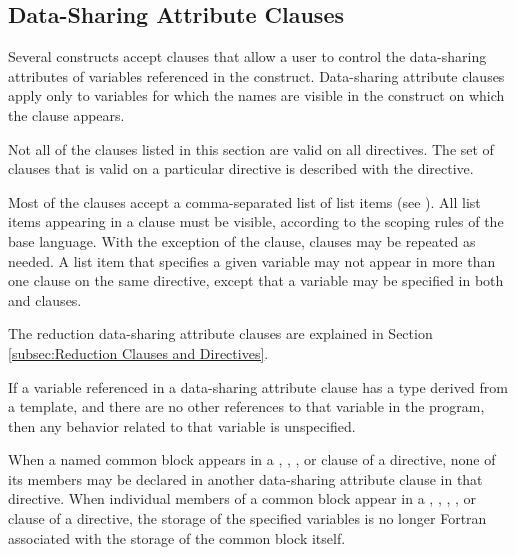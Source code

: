 \subsection{Data-Sharing Attribute Clauses}
\label{subsec:Data-Sharing Attribute Clauses}
Several constructs accept clauses that allow a user to control the data-sharing attributes
of variables referenced in the construct. Data-sharing attribute clauses apply only to
variables for which the names are visible in the construct on which the clause appears.

Not all of the clauses listed in this section are valid on all directives. The set of clauses
that is valid on a particular directive is described with the directive.

Most of the clauses accept a comma-separated list of list items (see
).
All list items appearing in a clause must be visible, according to the scoping rules
of the base language. With the exception of the  clause, clauses may be
repeated as needed. A list item that specifies a given variable may not appear in more
than one clause on the same directive, except that a variable may be specified in both
 and  clauses.

The reduction data-sharing attribute clauses are explained in Section \ref{subsec:Reduction Clauses and Directives}.

\begin{cppspecific}
If a variable referenced in a data-sharing attribute clause has a type derived from a
template, and there are no other references to that variable in the program, then any
behavior related to that variable is unspecified.
\end{cppspecific}
%
\begin{fortranspecific}
When a named common block appears in a , ,
, or  clause of a directive, none of its members may be declared
in another data-sharing attribute clause in that directive. When individual members of a common block appear in a , ,
, , or  clause of a directive, the storage of the specified variables is no longer Fortran associated with the storage of the common block itself.
\end{fortranspecific}










